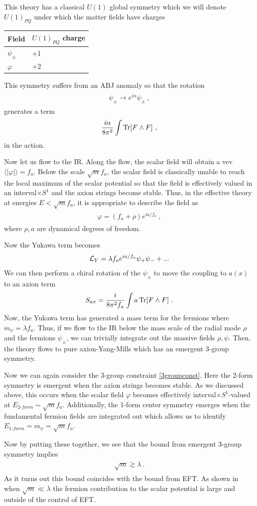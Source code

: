 \documentclass[11pt]{article}
\newcommand{\eq}[1]{\begin{align}\begin{split}#1\end{split}\end{align}}
\def\Tr{{\rm Tr}}
\def\CL {{\cal L}}
\begin{document}
This theory has a classical $U(1)$ global symmetry which we will denote $U(1)_{PQ}$  under which the matter fields have charges
\begin{center}
\begin{tabular}{l|l}
Field & $U(1)_{PQ}$ charge\\
\hline
$\psi_\pm $ & +1\\
$\varphi $ & +2
\end{tabular}
\end{center}

\noindent This symmetry suffers from an ABJ anomaly so that the rotation 
\eq{
\psi_\pm \to e^{ i \alpha} \psi_\pm~,
}
generates a term 
\eq{
\frac{i \alpha}{8\pi^2}\int \Tr[F\wedge F]~,
}
in the action. 

Now let us flow to the IR. Along the flow, the scalar field will obtain a vev $\big\langle |\varphi|\big\rangle=f_a$. Below the scale $\sqrt{m}f_a$, the scalar field is classically unable to reach the local maximum of the scalar potential so that the field is effectively valued in an interval$\times S^1$ and the axion strings become stable. Thus, in the effective theory at energies $E<\sqrt{m}f_a$, it is appropriate to describe the field as 
\eq{\label{radialexp}
\varphi=(f_a+\rho)e^{i a/f_a}~,
}
where $\rho,a$ are dynamical degrees of freedom. 

Now the Yukawa term becomes 
\eq{
\CL_{Y}=\lambda f_a e^{i a/f_a}\psi_+\psi_-+...
}
We can then perform a chiral rotation of the $\psi_\pm$ to move the coupling to $a(x)$ to an axion term
\eq{
S_{ax}=\frac{i}{8\pi^2f_a}\int a\,\Tr[F\wedge F]~. 
}
Now, the Yukawa term has generated a mass term for the fermions where $m_\psi=\lambda f_a$. Thus, if we flow to the IR below the mass scale of the radial mode $\rho$ and the fermions $\psi_\pm$, we can trivially integrate out the massive fields $\rho,\psi$. Then, the theory flows to pure axion-Yang-Mills which has an emergent 3-group symmetry. 

Now we can again consider the  3-group constraint \eqref{3groupconst}.  
Here the 2-form symmetry is emergent when the axion strings becomes stable. As we discussed above, this occurs when the scalar field $\varphi$ becomes effectively interval$\times S^1$-valued  at  $E_{2\text{-}form}\sim \sqrt{m}f_a$.  
Additionally, the 1-form center symmetry emerges when the fundamental fermion fields are integrated out which allows us to identify $E_{1\text{-}form}=m_\psi=\sqrt{m}f_a$. 

Now by putting these together, we see that the bound from emergent 3-group symmetry implies
\eq{
\sqrt{m} \gtrsim \lambda ~.
}
As it turns out this bound coincides with the bound from EFT. As shown in \cite{Brennan:2020ehu} when $\sqrt{m}\ll\lambda$ the fermion contribution to the scalar potential is large and outside of the control of EFT. 
\end{document}
